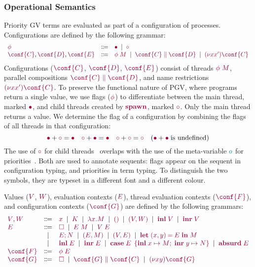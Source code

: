 \documentclass[main.tex]{subfiles}
\begin{document}
\subsubsection*{Operational Semantics}
Priority GV terms are evaluated as part of a configuration of processes. Configurations are defined by the following grammar:
\[
\begin{array}[t]{lcl}
  \tm{\phi}
  & \Coloneqq & \tm{\main}
    \sep        \tm{\child}
  \\
  \tm{\conf{C}}, \tm{\conf{D}}, \tm{\conf{E}}
  & \Coloneqq & \tm{\phi\;M}
    \sep        \tm{\ppar{\conf{C}}{\conf{D}}}
    \sep        \tm{\res{x}{x'}{\conf{C}}}
\end{array}
\]
Configurations ($\tm{\conf{C}}$, $\tm{\conf{D}}$, $\tm{\conf{E}}$) consist of threads $\tm{\phi\;M}$, parallel compositions $\tm{\ppar{\conf{C}}{\conf{D}}}$, and name restrictions $\tm{\res{x}{x'}{\conf{C}}}$. To preserve the functional nature of PGV, where programs return a single value, we use flags ($\tm{\phi}$) to differentiate between the main thread, marked $\tm{\main}$, and child threads created by $\tm{\spawn}$, marked $\tm{\child}$. Only the main thread returns a value. We determine the flag of a configuration by combining the flags of all threads in that configuration:
\[
  \tm{\main}  + \tm{\child} = \tm{\main}
  \quad
  \tm{\child} + \tm{\main}  = \tm{\main}
  \quad
  \tm{\child} + \tm{\child} = \tm{\child}
  \quad
  (\tm{\main}  + \tm{\main} \; \text{is undefined})
\]
The use of $\tm{\child}$ for child threads~\cite{lindleymorris15} overlaps with the use of the meta-variable $\cs{o}$ for priorities~\cite{dardhagay18}. Both are used to annotate sequents: flags appear on the sequent in configuration typing, and priorities in term typing. To distinguish the two symbols, they are typeset in a different font and a different colour.

Values ($\tm{V}$, $\tm{W}$), evaluation contexts ($\tm{E}$), thread evaluation contexts ($\tm{\conf{F}}$), and configuration contexts ($\tm{\conf{G}}$) are defined by the following grammars:
\[
\begin{array}[t]{lcl}
  \tm{V}, \tm{W}
  & \Coloneqq & \tm{x}
    \sep        \tm{K}
    \sep        \tm{\lambda x.M}
    \sep        \tm{\unit}
    \sep        \tm{\pair{V}{W}}
    \sep        \tm{\inl{V}}
    \sep        \tm{\inr{V}} \\
  \tm{E}
  & \Coloneqq & \tm{\hole}
    \sep        \tm{E\;M}
    \sep        \tm{V\;E} \\
  & \sep      & \tm{\andthen{E}{N}}
    \sep        \tm{\pair{E}{M}}
    \sep        \tm{\pair{V}{E}}
    \sep        \tm{\letpair{x}{y}{E}{M}} \\
  & \sep      & \tm{\inl{E}}
    \sep        \tm{\inr{E}}
    \sep        \tm{\casesum{E}{x}{M}{y}{N}}
    \sep        \tm{\absurd{E}} \\
  \tm{\conf{F}}
  & \Coloneqq & \tm{\phi\;E}
  \\
  \tm{\conf{G}}
  & \Coloneqq & \tm{\hole}
    \sep        \tm{\ppar{\conf{G}}{\conf{C}}}
    \sep        \tm{\res{x}{y}{\conf{G}}}
\end{array}
\]
\end{document}
